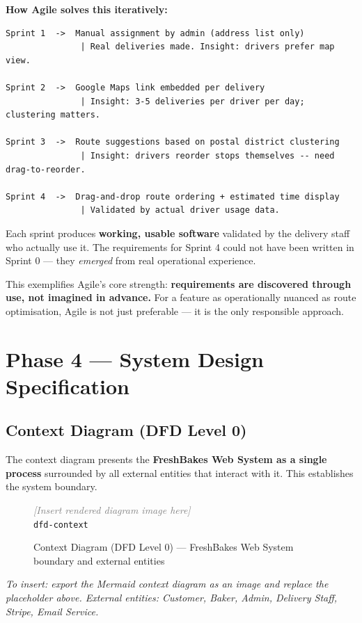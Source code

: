 \documentclass[12pt, a4paper]{report}
\newcommand{\diagramplaceholder}[2]{%
  \begin{figure}[H]
    \centering
    \begin{mdframed}[linecolor=coderule, backgroundcolor=codegray,
                     innerleftmargin=12pt, innerrightmargin=12pt,
                     innertopmargin=20pt, innerbottommargin=20pt]
      \centering
      \textit{\textcolor{gray}{[Insert rendered diagram image here]}}\\[6pt]
      \texttt{\small #1}
    \end{mdframed}
    \caption{#2}
    \label{fig:#1}
  \end{figure}
}
\begin{document}
\textbf{How Agile solves this iteratively:}

\begin{lstlisting}[style=wireframe]
Sprint 1  ->  Manual assignment by admin (address list only)
               | Real deliveries made. Insight: drivers prefer map view.

Sprint 2  ->  Google Maps link embedded per delivery
               | Insight: 3-5 deliveries per driver per day; clustering matters.

Sprint 3  ->  Route suggestions based on postal district clustering
               | Insight: drivers reorder stops themselves -- need drag-to-reorder.

Sprint 4  ->  Drag-and-drop route ordering + estimated time display
               | Validated by actual driver usage data.
\end{lstlisting}

Each sprint produces \textbf{working, usable software} validated by the
delivery staff who actually use it. The requirements for Sprint 4 could not
have been written in Sprint 0 --- they \textit{emerged} from real operational
experience.

This exemplifies Agile's core strength: \textbf{requirements are discovered
through use, not imagined in advance.} For a feature as operationally nuanced
as route optimisation, Agile is not just preferable --- it is the only
responsible approach.

\chapter{Phase 4 --- System Design Specification}

\section{Context Diagram (DFD Level 0)}

The context diagram presents the \textbf{FreshBakes Web System as a single
process} surrounded by all external entities that interact with it. This
establishes the system boundary.

\diagramplaceholder{dfd-context}{Context Diagram (DFD Level 0) --- FreshBakes Web System boundary and external entities}

\textit{To insert: export the Mermaid context diagram as an image and replace
the placeholder above. External entities: Customer, Baker, Admin, Delivery
Staff, Stripe, Email Service.}
\end{document}
